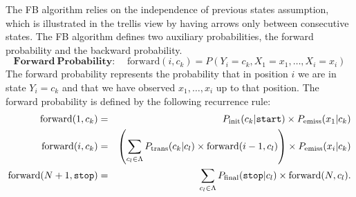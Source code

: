 The FB algorithm relies on the independence of previous states
assumption, which  
is illustrated in the trellis view by having arrows only between consecutive states. 
The FB algorithm defines two auxiliary probabilities, the forward probability and the backward probability. 
\begin{equation}
\label{eq::forward}
\mathbf{Forward \ Probability\!:}\;\;\;\;  \mathrm{forward}(i, c_k) = P(Y_i = c_k, X_1=x_1,\ldots, X_i = x_i)
\end{equation}
The forward probability represents the probability that in position
$i$ we are in state $Y_i = c_k$ and that we have observed $x_1,\ldots,x_i$
up to that position. The forward probability is defined by the
following recurrence rule: 
\begin{eqnarray}
\mathrm{forward}(1, c_k) &=& P_{\mathrm{init}}(c_k|\text{\tt start}) \times 
P_{\mathrm{emiss}}(x_1 | c_k)
 \\
 \mathrm{forward}(i, c_k) &=& \left( \displaystyle \sum_{c_l \in \Lambda} P_{\mathrm{trans}}(c_k | c_l) \times \mathrm{forward}(i-1, c_l) \right) \times P_{\mathrm{emiss}}(x_i | c_k)  \label{forwardRecursion}
 \\
  \mathrm{forward}(N+1, \text{\tt stop}) &=& \sum_{c_l \in \Lambda} P_{\mathrm{final}}(\text{\tt stop} | c_l) \times \mathrm{forward}(N, c_l).
\end{eqnarray}

%
%


